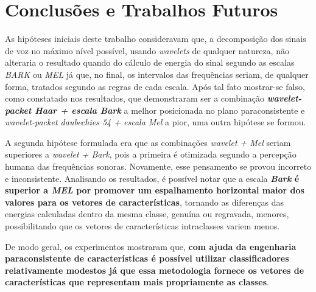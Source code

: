 \chapter{Conclusões e Trabalhos Futuros} \label{chap:conclusions}
	\par As hipóteses iniciais deste trabalho consideravam que, a decomposição dos sinais de voz no máximo nível possível, usando \textit{wavelets} de qualquer natureza, não alteraria o resultado quando do cálculo de energia do sinal segundo as escalas \textit{BARK} ou \textit{MEL} já que, no final, os intervalos das frequências seriam, de qualquer forma, tratados segundo as regras de cada escala. Após tal fato mostrar-se falso, como constatado nos resultados, que demonstraram ser a combinação \textbf{\textit{wavelet-packet Haar + escala Bark}} a melhor posicionada no plano paraconsistente e \textit{wavelet-packet daubechies 54 + escala Mel} a pior, uma outra hipótese se formou.
	
	\par A segunda hipótese formulada era que as combinações \textit{wavelet + Mel} seriam superiores a \textit{wavelet + Bark}, pois a primeira é otimizada segundo a percepção humana das frequências sonoras. Novamente, esse pensamento se provou incorreto e inconsistente. Analisando os resultados, é possível notar que a escala \textbf{\textit{Bark} é superior a \textit{MEL} por promover um espalhamento horizontal maior dos valores para os vetores de características}, tornando as diferenças das energias calculadas dentro da mesma classe, genuína ou regravada, menores, possibilitando que os vetores de características intraclasses variem menos.

    \par De modo geral, os experimentos mostraram que, \textbf{com ajuda da engenharia paraconsistente de características é possível utilizar classificadores relativamente modestos já que essa metodologia fornece os vetores de características que representam mais propriamente as classes}.
    
    

